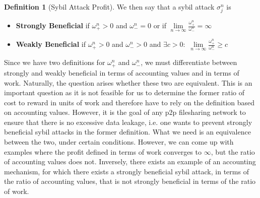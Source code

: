 \documentclass[11pt,a4paper]{article}
\theoremstyle{definition}
\newtheorem{definition}{Definition}[section]
\theoremstyle{theorem}
\theoremstyle{proposition}
\theoremstyle{corollary}
\theoremstyle{lemma}
\theoremstyle{example}
\theoremstyle{remark}
\begin{document}
\begin{definition}[Sybil Attack Profit]
\noindent{}We then say that a sybil attack $\sigma^n_j$ is
\begin{itemize}
\item[] {\bf Strongly Beneficial} if $\omega^n_{+}>0$ and $\omega^n_{-}=0$ or if $\lim\limits_{n\rightarrow\infty}\frac{\omega^n_{+}}{\omega^n_{-}}=\infty$
\item[] {\bf Weakly Beneficial} if $\omega^n_{+}>0$ and $\omega^n_{-}>0$ and $\exists c>0:\,\,\lim\limits_{n\rightarrow\infty}\frac{\omega^n_{+}}{\omega^n_{-}}\geq{}c$
\end{itemize}
\noindent{}Since we have two definitions for $\omega^n_{+}$ and $\omega^n_{-}$, we must differentiate between strongly and weakly beneficial in terms of accounting values and in terms of work. Naturally, the question arises whether these two are equivalent. This is an important question as it is not feasible for us to determine the former ratio of cost to reward in units of work and therefore have to rely on the definition based on accounting values. However, it is the goal of any p2p filesharing network to ensure that there is no excessive data leakage, i.e. one wants to prevent strongly beneficial sybil attacks in the former definition. What we need is an equivalence between the two, under certain conditions. However, we can come up with examples where the profit defined in terms of work converges to $\infty$, but the ratio of accounting values does not. Inversely, there exists an example of an accounting mechanism, for which there exists a strongly beneficial sybil attack, in terms of the ratio of accounting values, that is not strongly beneficial in terms of the ratio of work. \vspace{1em}\\
\end{definition}
\end{document}

